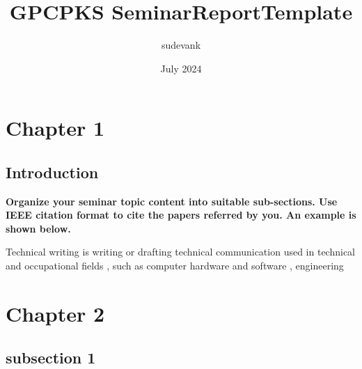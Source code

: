 \documentclass[12pt,a4paper]{report}
\title{GPCPKS SeminarReportTemplate}
\author{sudevank }
\date{July 2024}
\begin{document}
\gdef \title{How to prepare a Seminar report using \LaTeX } %
\gdef \author{Student Name}	 %
\gdef \dept{Electronics  Engineering} %
\gdef \degree{Diploma } %
\gdef \branch{Electronics  Engineering} %
\gdef \college{Government Polytechnic College}
\gdef \collegeplace{Palakkad}
\gdef \rollno{TVE17EC0XY} %
\gdef \deptabbr{Dept.of Electronics} %
\gdef \guide{Lecture-1}
\gdef \hod{Dr. Dileep P} %
\gdef \hoddes{Professor and Head} %

\gdef \acadyear{2024 - 25} %
\gdef \month{November 2024} %
\gdef \date{21-11-2020} %





 



\thispagestyle{empty}
\newpage
\tableofcontents
\listoffigures
\listoftables

\cleardoublepage
\setcounter{page}{1}

\chapter{Chapter 1}
\section{Introduction}
\textbf{Organize your seminar topic content into suitable sub-sections. Use IEEE citation format to cite the papers referred by you. An example is shown below.}
\par
Technical writing is writing or drafting technical communication used in technical and occupational fields \cite{ahmed2022cryptographic}, such as computer hardware and software \cite{bsnlwebsite}, engineering
\chapter{Chapter 2}
\section{subsection 1}
	
\end{document}
